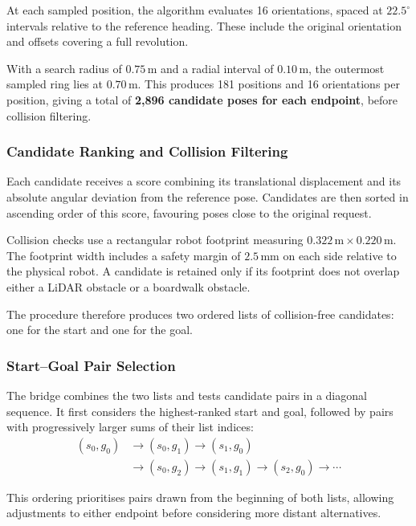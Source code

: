 \documentclass[a4paper,11pt,oneside]{book}
\begin{document}
At each sampled position, the algorithm evaluates 16 orientations,
spaced at $22.5^\circ$ intervals relative to the reference heading.
These include the original orientation and offsets covering a full
revolution.

With a search radius of $0.75\,\mathrm{m}$ and a radial interval of
$0.10\,\mathrm{m}$, the outermost sampled ring lies at
$0.70\,\mathrm{m}$. This produces 181 positions and 16 orientations
per position, giving a total of \textbf{2,896 candidate poses for
each endpoint}, before collision filtering.

\subsubsection{Candidate Ranking and Collision Filtering}

Each candidate receives a score combining its translational
displacement and its absolute angular deviation from the reference
pose. Candidates are then sorted in ascending order of this score,
favouring poses close to the original request.

Collision checks use a rectangular robot footprint measuring
$0.322\,\mathrm{m} \times 0.220\,\mathrm{m}$. The footprint width
includes a safety margin of $2.5\,\mathrm{mm}$ on each side relative
to the physical robot. A candidate is retained only if its footprint
does not overlap either a LiDAR obstacle or a boardwalk obstacle.

The procedure therefore produces two ordered lists of collision-free
candidates: one for the start and one for the goal.

\subsubsection{Start--Goal Pair Selection}

The bridge combines the two lists and tests candidate pairs in a
diagonal sequence. It first considers the highest-ranked start and
goal, followed by pairs with progressively larger sums of their
list indices:
%
\[
\begin{aligned}
(s_0,g_0)
&\rightarrow (s_0,g_1)
\rightarrow (s_1,g_0) \\
&\rightarrow (s_0,g_2)
\rightarrow (s_1,g_1)
\rightarrow (s_2,g_0)
\rightarrow \cdots
\end{aligned}
\]

This ordering prioritises pairs drawn from the beginning of both
lists, allowing adjustments to either endpoint before considering
more distant alternatives.
\end{document}
